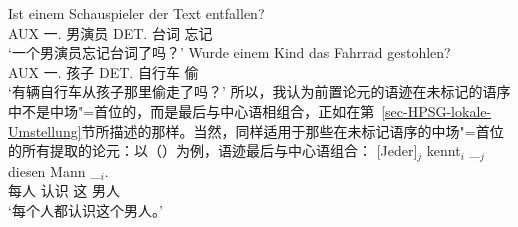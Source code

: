 \ex 
\gll Ist einem Schauspieler der Text entfallen?\\
      AUX  一.\dat{} 男演员     DET.\nom{} 台词 忘记\\
\glt `一个男演员忘记台词了吗？'
\ex
\gll Wurde einem Kind das Fahrrad gestohlen?\\
     AUX 一.\dat{} 孩子 DET.\nom{} 自行车 偷\\
\glt `有辆自行车从孩子那里偷走了吗？'
\zl
所以，我认为前置论元的语迹在未标记的语序中不是中场"=首位的，而是最后与中心语相组合，正如在第~\ref{sec-HPSG-lokale-Umstellung}节所描述的那样。当然，同样适用于那些在未标记语序的中场"=首位的所有提取的论元：以（）为例，语迹最后与中心语组合：
\ea
\label{Beispiel-jeder-kennt-diesen-Mann-HPSG}
\gll {}[Jeder]$_j$ kennt$_i$ \_$_j$ diesen Mann \_$_i$.\\
	 {}\spacebr{}每人 认识 {} 这 男人\\
\glt `每个人都认识这个男人。'
\z

